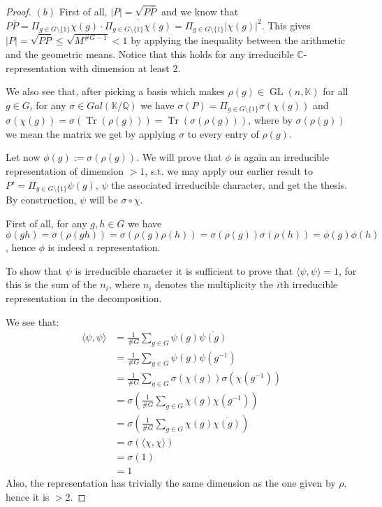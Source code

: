 \documentclass{article}
\newcommand{\numberset}{\mathbb}
\newcommand{\Q}{\numberset{Q}}
\newcommand{\C}{\numberset{C}}
\newcommand{\K}{\numberset{K}}
\DeclareMathOperator{\GL}{GL}
\DeclareMathOperator{\Tr}{Tr}
\begin{document}
\begin{proof}
    $(b)$ First of all, $|P|=\sqrt{P\overline{P}}$ and we know that
    $P\overline{P}=\Pi_{g\in G\setminus\{1\}}\chi(g)\cdot\overline{\Pi_{g\in
    G\setminus\{1\}}\chi(g)}=\Pi_{g\in G\setminus\{1\}}|\chi(g)|^2$. This gives
    $|P|=\sqrt{P\overline{P}}\leq\sqrt{M^{\#G-1}}<1$ by applying the inequality
    between the arithmetic and the geometric means. Notice that this holds for
    any irreducible $\C$-representation with dimension at least 2.

    We also see that, after picking a basis which makes $\rho(g)\in\GL(n,\K)$
    for all $g\in G$, for any $\sigma\in Gal(\K/\Q)$ we have $\sigma(P)=
    \Pi_{g\in G\setminus\{1\}}\sigma(\chi(g))$ and
    $\sigma(\chi(g))=\sigma(\Tr(\rho(g)))=\Tr(\sigma(\rho(g)))$, where by
    $\sigma(\rho(g))$ we mean the matrix we get by applying $\sigma$ to every
    entry of $\rho(g)$.

    Let now $\phi(g):=\sigma(\rho(g))$. We will prove that $\phi$ is again an
    irreducible representation of dimension $>1$, s.t. we may apply our earlier
    result to $P'=\Pi_{g\in G\setminus\{1\}}\psi(g)$, $\psi$ the associated
    irreducible character, and get the thesis. By construction, $\psi$ will be
    $\sigma\circ\chi$.

    First of all, for any $g,h\in G$ we have
    $\phi(gh)=\sigma(\rho(gh))=\sigma(\rho(g)\rho(h))=
    \sigma(\rho(g))\sigma(\rho(h))=\phi(g)\phi(h)$, hence $\phi$ is indeed a
    representation.

    To show that $\psi$ is irreducible character it is sufficient to prove that
    $\langle\psi,\psi\rangle=1$, for this is the sum of the $n_i$, where $n_i$
    denotes the multiplicity the $i$th irreducible representation in the
    decomposition.

    We see that:
    \begin{align*}
        \langle\psi,\psi\rangle &=\frac{1}{\#G}\sum_{g\in
        G}\psi(g)\overline{\psi(g)} \\
        &=\frac{1}{\#G}\sum_{g\in G}\psi(g)\psi(g^{-1}) \\
        &=\frac{1}{\#G}\sum_{g\in G}\sigma(\chi(g))\sigma(\chi(g^{-1})) \\
        &=\sigma(\frac{1}{\#G}\sum_{g\in G}\chi(g)\chi(g^{-1})) \\
        &=\sigma(\frac{1}{\#G}\sum_{g\in G}\chi(g)\overline{\chi(g)}) \\
        &=\sigma(\langle\chi,\chi\rangle) \\
        &=\sigma(1) \\
        &=1
    \end{align*}
    Also, the representation has trivially the same dimension as the one given
    by $\rho$, hence it is $>2$.
\end{proof}
\end{document}
